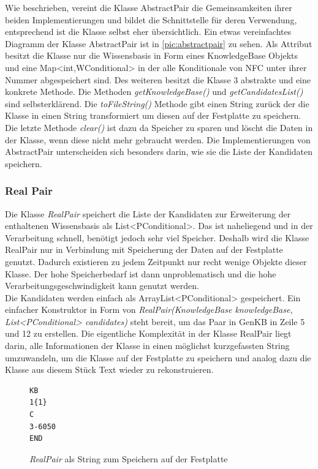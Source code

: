 \documentclass[12pt,a4paper]{article}
\begin{document}
Wie beschrieben, vereint die Klasse AbstractPair die Gemeinsamkeiten ihrer beiden Implementierungen und bildet die Schnittstelle für deren Verwendung, entsprechend ist die Klasse selbst eher übersichtlich. Ein etwas vereinfachtes Diagramm der Klasse AbstractPair ist in \autoref{pic:abstractpair} zu sehen. Als Attribut besitzt die Klasse nur die Wissensbasis in Form eines KnowledgeBase Objekts und eine Map<int,WConditional> in der alle Konditionale von NFC unter ihrer Nummer abgespeichert sind. Des weiteren besitzt die Klasse 3 abstrakte und eine konkrete Methode. Die Methoden \textit{getKnowledgeBase()} und \textit{ getCandidatesList()} sind selbsterklärend. Die \textit{toFileString()} Methode gibt einen String zurück der die Klasse in einen String transformiert um diesen auf der Festplatte zu speichern. Die letzte Methode \textit{clear()} ist dazu da Speicher zu sparen und löscht die Daten in der Klasse, wenn diese nicht mehr gebraucht werden. Die Implementierungen von AbstractPair unterscheiden sich besonders darin, wie sie die Liste der Kandidaten speichern.

\subsubsection{Real Pair}
Die Klasse \textit{RealPair} speichert die Liste der Kandidaten zur Erweiterung der enthaltenen Wissensbasis als List<PConditional>. Das ist naheliegend und in der Verarbeitung schnell, benötigt jedoch sehr viel Speicher. Deshalb wird die Klasse RealPair nur in Verbindung mit Speicherung der Daten auf der Festplatte genutzt. Dadurch existieren zu jedem Zeitpunkt nur recht wenige Objekte dieser Klasse. Der hohe Speicherbedarf ist dann unproblematisch und die hohe Verarbeitungsgeschwindigkeit kann genutzt werden. \\
Die Kandidaten werden einfach als ArrayList<PConditional> gespeichert. Ein einfacher Konstruktor in Form von \textit{RealPair(KnowledgeBase knowledgeBase, List<PConditional> candidates)} steht bereit, um das Paar in GenKB in Zeile 5 und 12 zu erstellen. Die eigentliche Komplexität in der Klasse RealPair liegt darin, alle Informationen der Klasse in einen möglichst kurzgefassten String umzuwandeln, um die Klasse auf der Festplatte zu speichern und analog dazu die Klasse aus diesem Stück Text wieder zu rekonstruieren.




\begin{figure}
\begin{lstlisting}
KB
1{1}
C
3-6050
END
\end{lstlisting}
\caption{\textit{RealPair} als String zum Speichern auf der Festplatte}
\label{code:pair-text}
\end{figure} 
\end{document}
